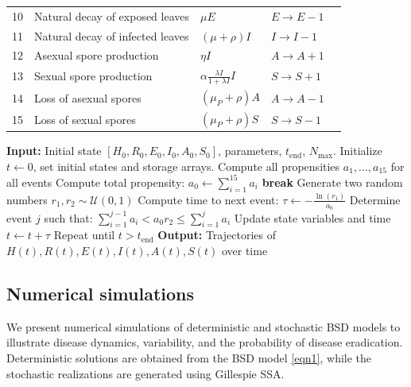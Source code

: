 \documentclass[11pt]{article}
\numberwithin{equation}{section}
\begin{document}
\begin{table}[!ht]
\begin{tabular}{lllll@{}}
        10 & Natural decay of exposed leaves & $\mu E$ & $E\rightarrow E-1$\\
        11 & Natural decay of infected leaves & $(\mu+\rho)I$ & $I\rightarrow I-1$\\
        12 & Asexual spore production & $\eta I$ & $A\rightarrow A+1$\\
        13 & Sexual spore production & $\alpha\frac{\lambda I}{1+\lambda I}I$ & $S\rightarrow S+1$\\
        14 & Loss of asexual spores & $(\mu_P+\rho)A$ & $A\rightarrow A-1$\\
        15 & Loss of sexual spores & $(\mu_P+\rho)S$ & $S\rightarrow S-1$ \\
        \bottomrule
    \end{tabular}
\end{table}
\begin{algorithm}[H]
    \caption{Gillespie algorithm for the BSD model}
    \begin{algorithmic}[1]
        \State  \textbf{Input:} Initial state $[H_0, R_0, E_0, I_0, A_0, S_0]$, parameters, $t_{\text{end}}$, $N_{\max}$.
        \State Initialize $t \gets 0$, set initial states and storage arrays.
        \State Compute all propensities $a_1, ..., a_{15}$ for all events
        \State Compute total propensity: $a_0\gets\sum_{i=1}^{15}a_i$
            \State\textbf{break}
        \EndIf
        \State Generate two random numbers $r_1,r_2\sim \mathcal{U}(0,1)$
        \State Compute time to next event: $\tau\gets-\frac{\ln(r_1)}{a_0}$
        \State Determine event $j$ such that: $\sum_{i=1}^{j-1}a_i<a_0r_2\leq\sum_{i=1}^{j}a_i$
        \State Update state variables and time $t\gets t+\tau$
        \State Repeat until $t>t_{\text{end}}$
        \EndWhile
        \State \textbf{Output:} Trajectories of $H(t), R(t), E(t), I(t), A(t), S(t)$ over time
    \end{algorithmic}
\end{algorithm}

\subsection{Numerical simulations}\label{sec:sim}
We present numerical simulations of deterministic and stochastic BSD models to illustrate disease dynamics, variability, and the probability of disease eradication. Deterministic solutions are obtained from the BSD model \eqref{eqn1}, while the stochastic realizations are generated using Gillespie SSA.
\end{document}
